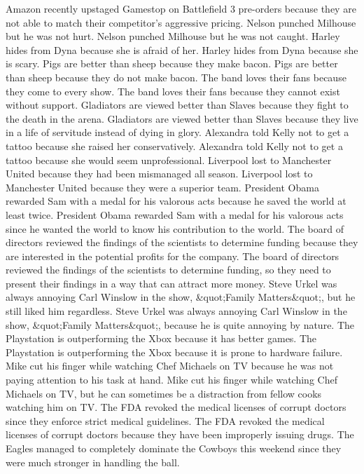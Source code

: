 \documentclass{article}
\begin{document}
\begin{enumerate}
	Amazon recently upstaged Gamestop on Battlefield 3 pre-orders because they are not able to match their competitor's aggressive pricing.
	Nelson punched Milhouse but he was not hurt.
	Nelson punched Milhouse but he was not caught.
	Harley hides from Dyna because she is afraid of her.
	Harley hides from Dyna because she is scary.
	Pigs are better than sheep because they make bacon.
	Pigs are better than sheep because they do not make bacon.
	The band loves their fans because they come to every show.
	The band loves their fans because they cannot exist without support.
	Gladiators are viewed better than Slaves because they fight to the death in the arena.
	Gladiators are viewed better than Slaves because they live in a life of servitude instead of dying in glory.
	Alexandra told Kelly not to get a tattoo because she raised her conservatively.
	Alexandra told Kelly not to get a tattoo because she would seem unprofessional.
	Liverpool lost to Manchester United because they had been mismanaged all season.
	Liverpool lost to Manchester United because they were a superior team.
	President Obama rewarded Sam with a medal for his valorous acts because he saved the world at least twice.
	President Obama rewarded Sam with a medal for his valorous acts since he wanted the world to know his contribution to the world.
	The board of directors reviewed the findings of the scientists to determine funding because they are interested in the potential profits for the company.
	The board of directors reviewed the findings of the scientists to determine funding, so they need to present their findings in a way that can attract more money.
	Steve Urkel was always annoying Carl Winslow in the show, &quot;Family Matters&quot;, but he still liked him regardless.
	Steve Urkel was always annoying Carl Winslow in the show, &quot;Family Matters&quot;, because he is quite annoying by nature.
	The Playstation is outperforming the Xbox because it has better games.
	The Playstation is outperforming the Xbox because it is prone to hardware failure.
	Mike cut his finger while watching Chef Michaels on TV because he was not paying attention to his task at hand.
	Mike cut his finger while watching Chef Michaels on TV, but he can sometimes be a distraction from fellow cooks watching him on TV.
	The FDA revoked the medical licenses of corrupt doctors since they enforce strict medical guidelines.
	The FDA revoked the medical licenses of corrupt doctors because they have been improperly issuing drugs.
	The Eagles managed to completely dominate the Cowboys this weekend since they were much stronger in handling the ball.

\end{enumerate}
\end{document}
